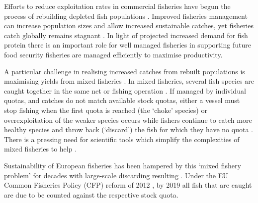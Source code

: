 \documentclass{nature}
\begin{document}
\begin{linenumbers}
 Efforts to reduce exploitation rates in commercial fisheries
have begun the process of rebuilding depleted fish populations \cite{Worm2009}.
Improved fisheries management  can increase
population sizes and allow increased sustainable catches, yet fisheries catch
globally remains stagnant . In light of projected
increased demand for fish protein  there is an
important role for well managed fisheries in supporting future food security
\cite{Mcclanahan2015}  
 fisheries
are managed efficiently to maximise productivity.

A particular challenge in realising increased catches from rebuilt populations
is maximising yields from mixed fisheries \cite{Branch2008, Kuriyama2016,
	Ulrich2016}. In mixed fisheries,  several fish species are caught together in the same net or
fishing operation . If managed by
individual quotas, and catches do not match available stock quotas, either a
vessel must stop fishing when the first quota is reached (the `choke' species)
or overexploitation of the weaker species occurs while fishers continue to
catch more healthy species and throw back (`discard') the fish for which they
have no quota \cite{Batsleer2015}. There is a pressing need
for scientific tools which simplify the complexities of mixed fisheries to help 
. 

Sustainability of European fisheries has been hampered by this `mixed fishery
problem' for decades with large-scale discarding resulting \cite{Uhlmann2014}.
 Under the EU Common Fisheries
Policy (CFP) reform of 2012 , by 2019 all fish that are caught are due to be
counted against the respective stock quota. 


\end{linenumbers}
\end{document}
